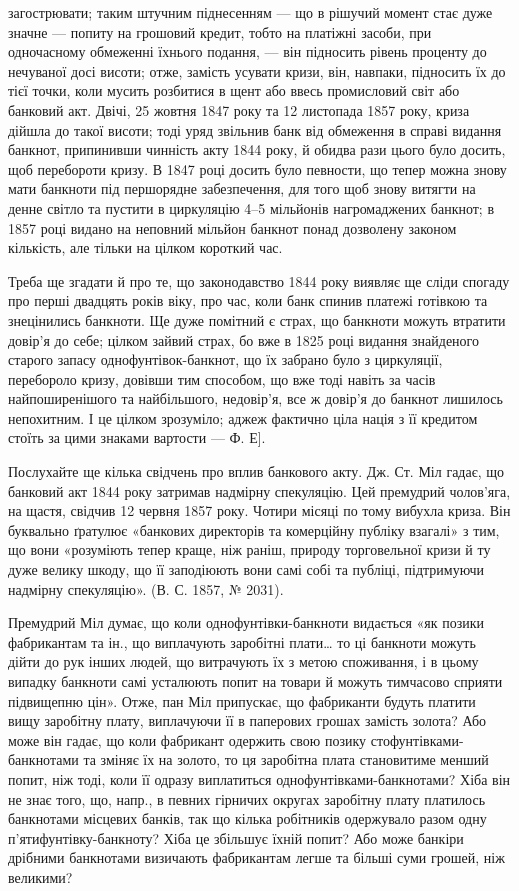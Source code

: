 \parcont{}  %
загострювати; таким штучним піднесенням — що в рішучий момент стає дуже
значне — попиту на грошовий кредит, тобто на платіжні засоби, при одночасному
обмеженні їхнього подання, — він підносить рівень проценту до нечуваної досі
висоти; отже, замість усувати кризи, він, навпаки, підносить їх до тієї точки,
коли мусить розбитися в щент або ввесь промисловий світ або банковий акт.
Двічі, 25 жовтня 1847 року та 12 листопада 1857 року, криза дійшла до такої
висоти; тоді уряд звільнив банк від обмеження в справі видання банкнот, припинивши
чинність акту 1844 року, й обидва рази цього було досить, щоб перебороти
кризу. В 1847 році досить було певности, що тепер можна знову мати
банкноти під першорядне забезпечення, для того щоб знову витягти на денне
світло та пустити в циркуляцію 4--5 мільйонів нагромаджених банкнот; в
1857 році видано на неповний мільйон банкнот понад дозволену законом кількість,
але тільки на цілком короткий час.

Треба ще згадати й про те, що законодавство 1844 року виявляє ще сліди
спогаду про перші двадцять років віку, про час, коли банк спинив платежі готівкою
та знецінились банкноти. Ще дуже помітний є страх, що банкноти можуть
втратити довір’я до себе; цілком зайвий страх, бо вже в 1825 році видання
знайденого старого запасу однофунтівок-банкнот, що їх забрано було з
циркуляції, перебороло кризу, довівши тим способом, що вже тоді навіть за часів
найпоширенішого та найбільшого, недовір’я, все ж довір’я до банкнот лишилось
непохитним. І це цілком зрозуміло; аджеж фактично ціла нація з її кредитом
стоїть за цими знаками вартости — Ф. Е].

Послухайте ще кілька свідчень про вплив банкового акту. Дж. Ст. Міл
гадає, що банковий акт 1844 року затримав надмірну спекуляцію. Цей премудрий
чолов’яга, на щастя, свідчив 12 червня 1857 року. Чотири місяці по тому
вибухла криза. Він буквально ґратулює «банкових директорів та комерційну
публіку взагалі» з тим, що вони «розуміють тепер краще, ніж раніш, природу
торговельної кризи й ту дуже велику шкоду, що її заподіюють вони самі собі
та публіці, підтримуючи надмірну спекуляцію». (В. С. 1857, № 2031).

Премудрий Міл думає, що коли однофунтівки-банкноти видається «як позики
фабрикантам та ін., що виплачують заробітні плати\dots{} то ці банкноти
можуть дійти до рук інших людей, що витрачують їх з метою споживання, і в
цьому випадку банкноти самі усталюють попит на товари й можуть тимчасово
сприяти підвищепню цін». Отже, пан Міл припускає, що фабриканти будуть
платити вищу заробітну плату, виплачуючи її в паперових грошах замість золота?
Або може він гадає, що коли фабрикант одержить свою позику стофунтівками-банкнотами
та зміняє їх на золото, то ця заробітна плата становитиме менший
попит, ніж тоді, коли її одразу виплатиться однофунтівками-банкнотами? Хіба
він не знає того, що, напр., в певних гірничих округах заробітну плату платилось
банкнотами місцевих банків, так що кілька робітників одержувало разом
одну п’ятифунтівку-банкноту? Хіба це збільшує їхній попит? Або може банкіри
дрібними банкнотами визичають фабрикантам легше та більші суми грошей,
ніж великими?


